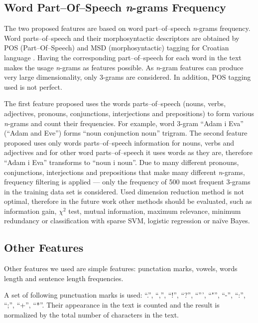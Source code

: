 \documentclass{llncs}
\begin{document}
\subsection{Word Part--Of--Speech \emph{n}-grams Frequency}
\label{sec:ngrami-tipova}
The two proposed features are based on word part--of--speech \emph{n}-grams
frequency. Word parts--of--speech and their morphosyntactic descriptors are obtained by POS
(Part--Of--Speech) and MSD (morphosyntactic) tagging for Croatian language
\cite{snajder08automatic}. Having the corresponding part--of--speech for
each word in the text makes the usage \emph{n}-grams as features
possible. As \emph{n}-gram features can produce very large dimensionality, 
only 3-grams are considered. In addition, POS tagging used is not perfect. 

The first feature proposed uses the words parts--of--speech
(nouns, verbs, adjectives, pronouns, conjunctions, interjections and
prepositions) to form various \emph{n}-grams and count their frequencies. For
example, word 3-gram ``Adam i Eva'' (``Adam and Eve'') forms ``noun
conjunction noun'' trigram. The second feature proposed uses only words
parts--of--speech information for nouns, verbs and adjectives and for other word
parts--of--speech it uses words as they are, therefore ``Adam i Eva'' transforms
to ``noun i noun''. Due to many different pronouns, conjunctions, interjections
and prepositions that make many different \emph{n}-grams, frequency filtering
is applied --- only the frequency of 500 most frequent 3-grams in the
training data set is considered. Used dimension reduction method is not optimal,
therefore in the future work other methods should be evaluated, such as information
gain, $\chi^2$ test, mutual information, maximum relevance, minimum redundancy
or classification with sparse SVM, logistic regression or na\"ive Bayes.

\subsection{Other Features}
\label{sec:znacajke-manje}
Other features we used are simple features: punctation marks, vowels, words
length and sentence length frequencies.

A set of following punctuation marks is used: ``.'', ``,'', ``!'', ``?'',
``''', ``"'', ``-'', ``:'', ``;'', ``+'', ``*''. Their appearance in the text is counted and
the result is normalized by the total number of characters in the text. 
\end{document}
